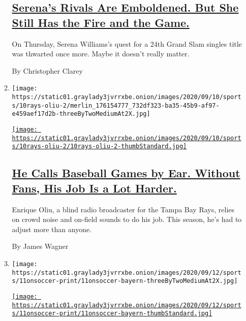 \begin{enumerate}
\begin{enumerate}
    \hypertarget{serenas-rivals-are-emboldened-but-she-still-has-the-fire-and-the-game}{%
    \subsection{\texorpdfstring{\href{/2020/09/11/sports/tennis/us-open-serena-williams.html}{Serena's
    Rivals Are Emboldened. But She Still Has the Fire and the
    Game.}}{Serena's Rivals Are Emboldened. But She Still Has the Fire and the Game.}}\label{serenas-rivals-are-emboldened-but-she-still-has-the-fire-and-the-game}}

    On Thursday, Serena Williams's quest for a 24th Grand Slam singles
    title was thwarted once more. Maybe it doesn't really matter.

    By Christopher Clarey
  \item
    \texttt{[image: https://static01.graylady3jvrrxbe.onion/images/2020/09/10/sports/10rays-oliu-2/merlin\_176154777\_732df323-ba35-45b9-af97-e459aef17d2b-threeByTwoMediumAt2X.jpg]}

    \href{/2020/09/11/sports/baseball/enrique-oliu-rays-broadcaster.html}{\texttt{[image: https://static01.graylady3jvrrxbe.onion/images/2020/09/10/sports/10rays-oliu-2/10rays-oliu-2-thumbStandard.jpg]}}

    \hypertarget{he-calls-baseball-games-by-ear-without-fans-his-job-is-a-lot-harder}{%
    \subsection{\texorpdfstring{\href{/2020/09/11/sports/baseball/enrique-oliu-rays-broadcaster.html}{He
    Calls Baseball Games by Ear. Without Fans, His Job Is a Lot
    Harder.}}{He Calls Baseball Games by Ear. Without Fans, His Job Is a Lot Harder.}}\label{he-calls-baseball-games-by-ear-without-fans-his-job-is-a-lot-harder}}

    Enrique Oliu, a blind radio broadcaster for the Tampa Bay Rays,
    relies on crowd noise and on-field sounds to do his job. This
    season, he's had to adjust more than anyone.

    By James Wagner
  \item
    \texttt{[image: https://static01.graylady3jvrrxbe.onion/images/2020/09/12/sports/11onsoccer-print/11onsoccer-bayern-threeByTwoMediumAt2X.jpg]}

    \href{/2020/09/11/sports/soccer/premier-league-preview.html}{\texttt{[image: https://static01.graylady3jvrrxbe.onion/images/2020/09/12/sports/11onsoccer-print/11onsoccer-bayern-thumbStandard.jpg]}}


\end{enumerate}
\end{enumerate}
